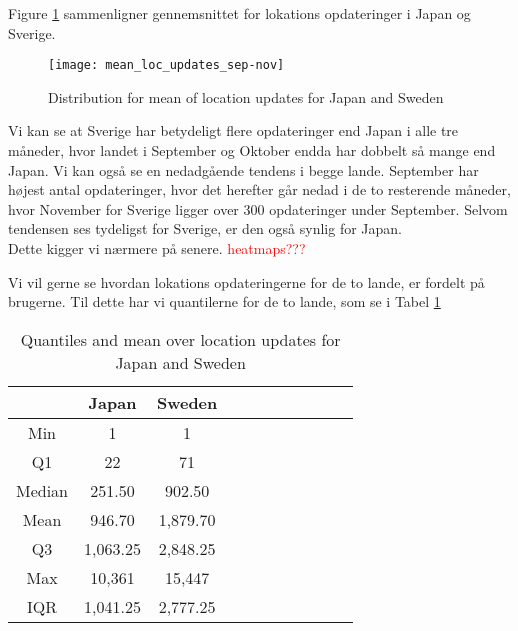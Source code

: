 Figure \ref{fig:mean_loc_updates_sep-nov} sammenligner gennemsnittet for lokations opdateringer i Japan og Sverige.
\begin{figure}[H]
    \hspace*{-2.2cm}
    \centering
    \texttt{[image: mean\_loc\_updates\_sep-nov]}
    \caption{Distribution for mean of location updates for Japan and Sweden}
    \label{fig:mean_loc_updates_sep-nov}
\end{figure}

Vi kan se at Sverige har betydeligt flere opdateringer end Japan i alle tre måneder, hvor landet i September og Oktober endda har dobbelt så mange end Japan. Vi kan også se en nedadgående tendens i begge lande. September har højest antal opdateringer, hvor det herefter går nedad i de to resterende måneder, hvor November for Sverige ligger over 300 opdateringer under September. Selvom tendensen ses tydeligst for Sverige, er den også synlig for Japan. \\
Dette kigger vi nærmere på senere. \textcolor{red}{heatmaps???}



Vi vil gerne se hvordan lokations opdateringerne for de to lande, er fordelt på brugerne. Til dette har vi quantilerne for de to lande, som se i Tabel \ref{tab:stat_loc_updates} 

\begin{table}[htbp]
        \centering
        \small
        \setlength\tabcolsep{2pt}
        \begin{tabular}{|c|c|c|c|c|c|c|c|c|c|c|}
            \hline
                         & Japan      &   Sweden      \\[-1pt]
            \hline
                 Min     &    1       &   1           \\
            \hline
                 Q1      &  22        &   71      \\
            \hline
                 Median  & 251.50     &   902.50      \\
            \hline
                 Mean    &  946.70   &  1,879.70     \\
            \hline
                 Q3      & 1,063.25    &   2,848.25     \\
            \hline
                 Max     &  10,361 &  15,447     \\
            \hline
                 IQR     &  1,041.25   &  2,777.25      \\
            \hline
            
        \end{tabular}
        \caption{Quantiles and mean over location updates for Japan and Sweden} %
        \label{tab:stat_loc_updates}
\end{table}


